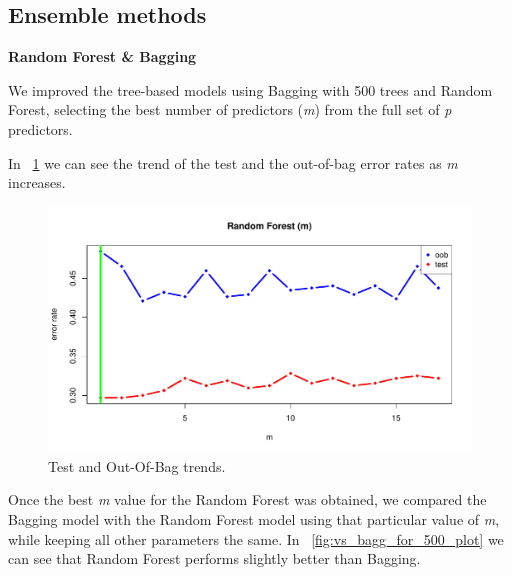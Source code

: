 \subsection{Ensemble methods}

\vspace{0.2cm}
\noindent
\textbf{Random Forest \& Bagging}

We improved the tree-based models using Bagging with 500 trees and Random Forest, selecting the best number of predictors (\textit{m}) from the full set of \textit{p} predictors.

In \Fig~\ref{fig:m_best_for_500_plot} we can see the trend of the test and the out-of-bag error rates as \textit{m} increases.

\begin{figure}[h]
	\centering
	\includegraphics[width=0.5\linewidth]{ImageFiles/Classification/Trees/m_best_for_500_plot}
	\caption{Test and Out-Of-Bag trends.}
	\label{fig:m_best_for_500_plot}
\end{figure}

Once the best \textit{m} value for the Random Forest was obtained, we compared the Bagging model with the Random Forest model using that particular value of \textit{m}, while keeping all other parameters the same.
In \Fig~\ref{fig:vs_bagg_for_500_plot} we can see that Random Forest performs slightly better than Bagging.

